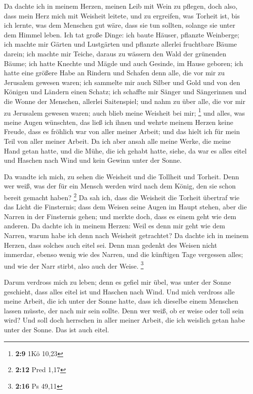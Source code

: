  Da dachte ich in meinem Herzen, meinen Leib mit Wein zu
pflegen, doch also, dass mein Herz mich mit Weisheit leitete, und zu
ergreifen, was Torheit ist, bis ich lernte, was dem Menschen gut wäre,
dass sie tun sollten, solange sie unter dem Himmel leben. 
Ich tat große Dinge: ich baute Häuser, pflanzte Weinberge; 
ich machte mir Gärten und Lustgärten und pflanzte allerlei fruchtbare
Bäume darein;  ich machte mir Teiche, daraus zu wässern den
Wald der grünenden Bäume;  ich hatte Knechte und Mägde und
auch Gesinde, im Hause geboren; ich hatte eine größere Habe an Rindern
und Schafen denn alle, die vor mir zu Jerusalem gewesen waren;
 ich sammelte mir auch Silber und Gold und von den Königen
und Ländern einen Schatz; ich schaffte mir Sänger und Sängerinnen und
die Wonne der Menschen, allerlei Saitenspiel;  und nahm zu
über alle, die vor mir zu Jerusalem gewesen waren; auch blieb meine
Weisheit bei mir; \footnote{\textbf{2:9} 1Kö 10,23}  und
alles, was meine Augen wünschten, das ließ ich ihnen und wehrte meinem
Herzen keine Freude, dass es fröhlich war von aller meiner Arbeit; und
das hielt ich für mein Teil von aller meiner Arbeit.  Da
ich aber ansah alle meine Werke, die meine Hand getan hatte, und die
Mühe, die ich gehabt hatte, siehe, da war es alles eitel und Haschen
nach Wind und kein Gewinn unter der Sonne.

 Da wandte ich mich, zu sehen die Weisheit und die Tollheit
und Torheit. Denn wer weiß, was der für ein Mensch werden wird nach dem
König, den sie schon bereit gemacht haben? \footnote{\textbf{2:12} Pred
  1,17}  Da sah ich, dass die Weisheit die Torheit übertraf
wie das Licht die Finsternis;  dass dem Weisen seine Augen
im Haupt stehen, aber die Narren in der Finsternis gehen; und merkte
doch, dass es einem geht wie dem anderen.  Da dachte ich in
meinem Herzen: Weil es denn mir geht wie dem Narren, warum habe ich denn
nach Weisheit getrachtet? Da dachte ich in meinem Herzen, dass solches
auch eitel sei.  Denn man gedenkt des Weisen nicht
immerdar, ebenso wenig wie des Narren, und die künftigen Tage vergessen
alles; und wie der Narr stirbt, also auch der Weise. \footnote{\textbf{2:16}
  Ps 49,11}

 Darum verdross mich zu leben; denn es gefiel mir übel, was
unter der Sonne geschieht, dass alles eitel ist und Haschen nach Wind.
 Und mich verdross alle meine Arbeit, die ich unter der
Sonne hatte, dass ich dieselbe einem Menschen lassen müsste, der nach
mir sein sollte.  Denn wer weiß, ob er weise oder toll sein
wird? Und soll doch herrschen in aller meiner Arbeit, die ich weislich
getan habe unter der Sonne. Das ist auch eitel.

